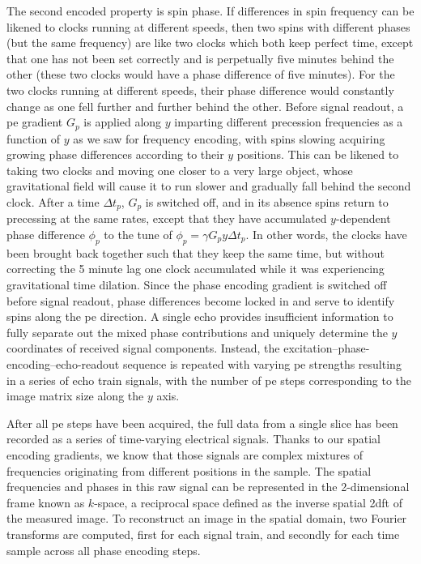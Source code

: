 The second encoded property is spin phase.
If differences in spin frequency can be likened to clocks running at different speeds, then two spins with different phases (but the same frequency) are like two clocks which both keep perfect time, except that one has not been set correctly and is perpetually five minutes behind the other (these two clocks would have a phase difference of five minutes).
For the two clocks running at different speeds, their phase difference would constantly change as one fell further and further behind the other.
Before signal readout, a \gls{pe} gradient $G_p$ is applied along $y$ imparting different precession frequencies as a function of $y$ as we saw for frequency encoding, with spins slowing acquiring growing phase differences according to their $y$ positions.
This can be likened to taking two clocks and moving one closer to a very large object, whose gravitational field will cause it to run slower and gradually fall behind the second clock.
After a time $\Delta t_p$, $G_p$ is switched off, and in its absence spins return to precessing at the same rates, except that they have accumulated $y$-dependent phase difference $\phi_p$ to the tune of $\phi_p=\gamma G_p y \Delta t_p$.
In other words, the clocks have been brought back together such that they keep the same time, but without correcting the 5 minute lag one clock accumulated while it was experiencing gravitational time dilation.
Since the phase encoding gradient is switched off before signal readout, phase differences become locked in and serve to identify spins along the \gls{pe} direction.
A single echo provides insufficient information to fully separate out the mixed phase contributions and uniquely determine the $y$ coordinates of received signal components.
Instead, the excitation--phase-encoding--echo-readout sequence is repeated with varying \gls{pe} strengths resulting in a series of echo train signals, with the number of \gls{pe} steps corresponding to the image matrix size along the $y$ axis.

After all \gls{pe} steps have been acquired, the full data from a single slice has been recorded as a series of time-varying electrical signals.
Thanks to our spatial encoding gradients, we know that those signals are complex mixtures of frequencies originating from different positions in the sample.
The spatial frequencies and phases in this raw signal can be represented in the 2-dimensional frame known as $k$-space, a reciprocal space defined as the inverse spatial \gls{2dft} of the measured image.
To reconstruct an image in the spatial domain, two Fourier transforms are computed, first for each signal train, and secondly for each time sample across all phase encoding steps.

